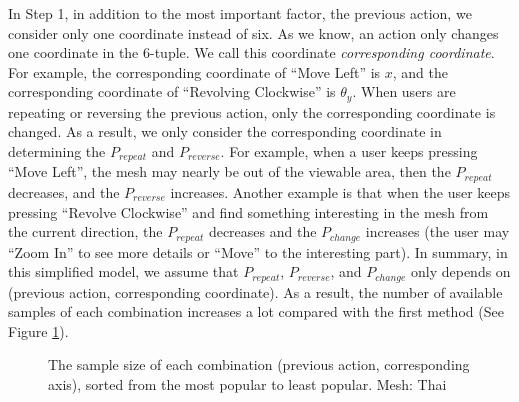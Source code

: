 In Step 1, in addition to the most important factor, the previous action, we consider only one coordinate instead of six.
As we know, an action only changes one coordinate in the 6-tuple. We call this coordinate \textit{corresponding coordinate}.
For example, the corresponding coordinate of ``Move Left'' is $x$, and the corresponding coordinate of 
``Revolving Clockwise'' is $\theta_y$. 
When users are repeating or reversing the previous action, 
only the corresponding coordinate is changed. 
As a result, we only consider the corresponding coordinate in determining the $P_{repeat}$ and $P_{reverse}$. 
For example, when a user keeps pressing ``Move Left'', the mesh may nearly be out of the viewable area, 
then the $P_{repeat}$ decreases, and the $P_{reverse}$ increases. 
Another example is that when the user keeps pressing ``Revolve Clockwise'' and find something interesting
in the mesh from the current direction,
the $P_{repeat}$ decreases and the $P_{change}$ increases (the user may ``Zoom In'' to see more details or ``Move'' to the interesting part).
In summary, in this simplified model, we assume that $P_{repeat}$, $P_{reverse}$, and $P_{change}$
only depends on (previous action, corresponding coordinate).
As a result, the number of available samples of each combination increases a lot compared with the first method
(See Figure \ref{f:user:newsample}). 
\begin{figure}
    \centering
    \caption{The sample size of each combination (previous action, corresponding axis), 
    sorted from the most popular to least popular.  Mesh: Thai}
    \label{f:user:newsample}
\end{figure}

